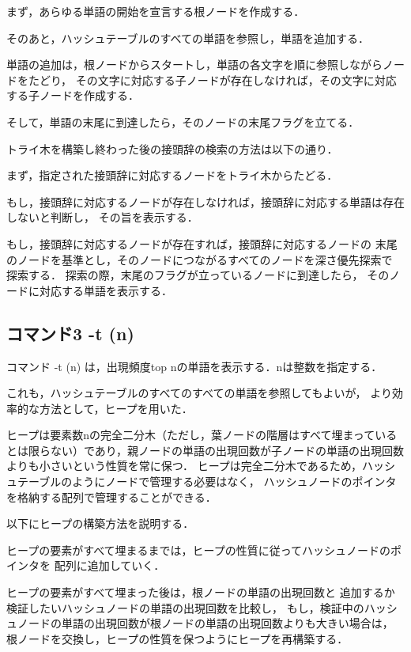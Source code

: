 \documentclass{jsarticle}
\begin{document}
    まず，あらゆる単語の開始を宣言する根ノードを作成する．

    そのあと，ハッシュテーブルのすべての単語を参照し，単語を追加する．

    単語の追加は，根ノードからスタートし，単語の各文字を順に参照しながらノードをたどり，
    その文字に対応する子ノードが存在しなければ，その文字に対応する子ノードを作成する．

    そして，単語の末尾に到達したら，そのノードの末尾フラグを立てる．

    トライ木を構築し終わった後の接頭辞の検索の方法は以下の通り．

    まず，指定された接頭辞に対応するノードをトライ木からたどる．
    
    もし，接頭辞に対応するノードが存在しなければ，接頭辞に対応する単語は存在しないと判断し，
    その旨を表示する．

    もし，接頭辞に対応するノードが存在すれば，接頭辞に対応するノードの
    末尾のノードを基準とし，そのノードにつながるすべてのノードを深さ優先探索で
    探索する．
    探索の際，末尾のフラグが立っているノードに到達したら，
    そのノードに対応する単語を表示する．

    \subsection{コマンド3 -t (n)}
    コマンド -t (n) は，出現頻度top nの単語を表示する．nは整数を指定する．

    これも，ハッシュテーブルのすべてのすべての単語を参照してもよいが，
    より効率的な方法として，ヒープを用いた．

    ヒープは要素数nの完全二分木（ただし，葉ノードの階層はすべて埋まっているとは限らない）であり，親ノードの単語の出現回数が子ノードの単語の出現回数よりも小さいという性質を常に保つ．
    ヒープは完全二分木であるため，ハッシュテーブルのようにノードで管理する必要はなく，
    ハッシュノードのポインタを格納する配列で管理することができる．

    以下にヒープの構築方法を説明する．

    ヒープの要素がすべて埋まるまでは，ヒープの性質に従ってハッシュノードのポインタを
    配列に追加していく．

    ヒープの要素がすべて埋まった後は，根ノードの単語の出現回数と
    追加するか検証したいハッシュノードの単語の出現回数を比較し，
    もし，検証中のハッシュノードの単語の出現回数が根ノードの単語の出現回数よりも大きい場合は，
    根ノードを交換し，ヒープの性質を保つようにヒープを再構築する．
\end{document}
